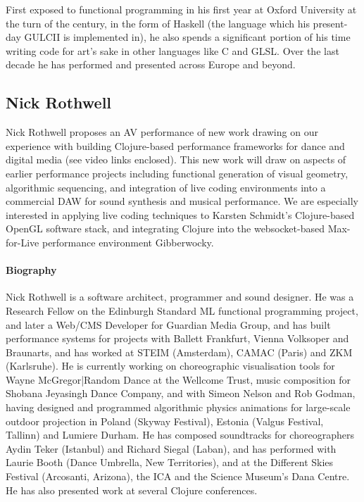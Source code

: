 \documentclass[sigplan,10pt,review]{acmart}\settopmatter{printfolios=true}
\begin{document}
First exposed to functional programming in his first year at Oxford University
at the turn of the century, in the form of Haskell (the language which his
present-day GULCII is implemented in), he also spends a significant portion of
his time writing code for art's sake in other languages like C and GLSL.  Over
the last decade he has performed and presented across Europe and beyond.

\subsection{Nick Rothwell}

Nick Rothwell proposes an AV performance of new work drawing on our experience
with building Clojure-based performance frameworks for dance and
digital media (see video links enclosed). This new work will draw on
aspects of earlier performance projects including functional
generation of visual geometry, algorithmic sequencing, and integration
of live coding environments into a commercial DAW for sound synthesis
and musical performance. We are especially interested in applying live
coding techniques to Karsten Schmidt's Clojure-based OpenGL software
stack, and integrating Clojure into the websocket-based Max-for-Live
performance environment Gibberwocky.


\paragraph{Biography} Nick Rothwell is a software architect, programmer and sound
designer. He was a Research Fellow on the Edinburgh Standard ML
functional programming project, and later a Web/CMS Developer for
Guardian Media Group, and has built performance systems for projects
with Ballett Frankfurt, Vienna Volksoper and Braunarts, and has worked
at STEIM (Amsterdam), CAMAC (Paris) and ZKM (Karlsruhe).  He is
currently working on choreographic visualisation tools for Wayne
McGregor|Random Dance at the Wellcome Trust, music composition for
Shobana Jeyasingh Dance Company, and with Simeon Nelson and Rob
Godman, having designed and programmed algorithmic physics animations
for large-scale outdoor projection in Poland (Skyway Festival),
Estonia (Valgus Festival, Tallinn) and Lumiere Durham.  He has
composed soundtracks for choreographers Aydin Teker (Istanbul) and
Richard Siegal (Laban), and has performed with Laurie Booth (Dance
Umbrella, New Territories), and at the Different Skies Festival
(Arcosanti, Arizona), the ICA and the Science Museum’s Dana Centre. He
has also presented work at several Clojure conferences.
\end{document}
